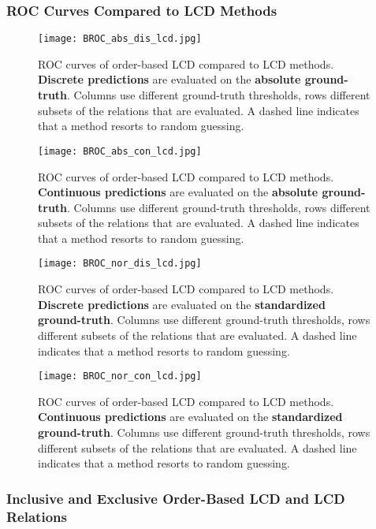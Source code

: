 \subsubsection{ROC Curves Compared to LCD Methods}

\begin{figure}[H]
    \centering
    \texttt{[image: BROC\_abs\_dis\_lcd.jpg]}
    \caption{ROC curves of order-based LCD compared to LCD methods. \textbf{Discrete predictions} are evaluated on the \textbf{absolute ground-truth}. Columns use different ground-truth thresholds, rows different subsets of the relations that are evaluated. A dashed line indicates that a method resorts to random guessing.}
\end{figure}
\begin{figure}[H]
    \centering
    \texttt{[image: BROC\_abs\_con\_lcd.jpg]}
    \caption{ROC curves of order-based LCD compared to LCD methods. \textbf{Continuous predictions} are evaluated on the \textbf{absolute ground-truth}. Columns use different ground-truth thresholds, rows different subsets of the relations that are evaluated. A dashed line indicates that a method resorts to random guessing.}
\end{figure}
\begin{figure}[H]
    \centering
    \texttt{[image: BROC\_nor\_dis\_lcd.jpg]}
    \caption{ROC curves of order-based LCD compared to LCD methods. \textbf{Discrete predictions} are evaluated on the \textbf{standardized ground-truth}. Columns use different ground-truth thresholds, rows different subsets of the relations that are evaluated. A dashed line indicates that a method resorts to random guessing.}
\end{figure}
\begin{figure}[H]
    \centering
    \texttt{[image: BROC\_nor\_con\_lcd.jpg]}
    \caption{ROC curves of order-based LCD compared to LCD methods. \textbf{Continuous predictions} are evaluated on the \textbf{standardized ground-truth}. Columns use different ground-truth thresholds, rows different subsets of the relations that are evaluated. A dashed line indicates that a method resorts to random guessing.}
\end{figure}


\subsubsection{Inclusive and Exclusive Order-Based LCD and LCD Relations}


